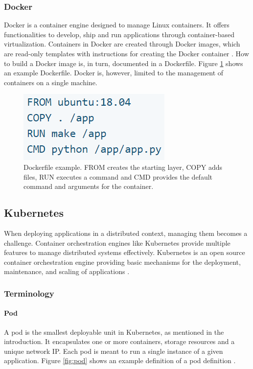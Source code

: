 \subsubsection{Docker}
Docker is a container engine designed to manage Linux containers. It offers functionalities to develop, ship and run applications through container-based virtualization\citep{Docker}. Containers in Docker are created through Docker images, which are read-only templates with instructions for creating the Docker container \citep{Docker-image}. How to build a Docker image is, in turn, documented in a Dockerfile. Figure \ref{fig:dockerfile} shows an example Dockerfile. Docker is, however, limited to the management of containers on a single machine.

\begin{figure}[h]
\begin{center}
\includegraphics[width=0.35 \textwidth]{Images/Dockerfile.PNG}
\end{center}
\captionsetup{justification=centering}
\caption{Dockerfile example. FROM creates the starting layer, COPY adds files, RUN executes a command and CMD provides the default command and arguments for the container\citep{Dockerfile}.}
\label{fig:dockerfile}
\end{figure}

\subsection{Kubernetes}
When deploying applications in a distributed context, managing them becomes a challenge. Container orchestration engines like Kubernetes provide multiple features to manage distributed systems effectively. Kubernetes is an open source container orchestration engine providing basic mechanisms for the deployment, maintenance, and scaling of applications \citep{kubernetes_github}.

\subsubsection{Terminology}

\paragraph{Pod} A pod is the smallest deployable unit in Kubernetes, as mentioned in the introduction. It encapsulates one or more containers, storage resources and a unique network IP. Each pod is meant to run a single instance of a given application. Figure \ref{fig:pod} shows an example definition of a pod definition \citep{Kubernetes-Pod}.

